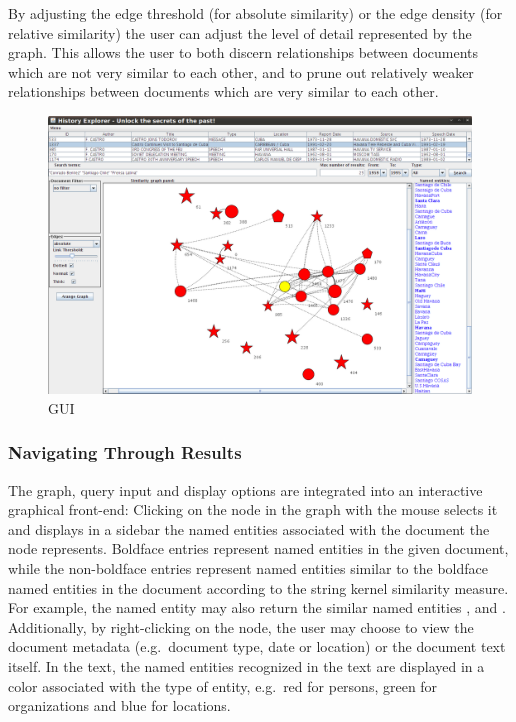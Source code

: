 By adjusting the edge threshold (for absolute similarity) or the edge density (for relative similarity) the user can adjust the level of detail represented by the graph. This allows the user to both discern relationships between documents which are not very similar to each other, and to prune out relatively weaker relationships between documents which are very similar to each other.

\pagebreak
\begin{figure}[t]
\centering
\caption{GUI}
\includegraphics[width=160mm]{gui.png}
\end{figure}

\subsubsection {Navigating Through Results}
\label{sec:navigation_through_results}
The graph, query input and display options are integrated into an interactive graphical front-end: Clicking on the node in the graph with the mouse selects it and displays in a sidebar the named entities associated with the document the node represents. Boldface entries represent named entities in the given document, while the non-boldface entries represent named entities similar to the boldface named entities in the document according to the string kernel similarity measure. For example, the named entity \textbf{} may also return the similar named entities ,  and . Additionally, by right-clicking on the node, the user may choose to view the document metadata (e.g.\ document type, date or location) or the document text itself. In the text, the named entities recognized in the text are displayed in a color associated with the type of entity, e.g.\ red for persons, green for organizations and blue for locations.

